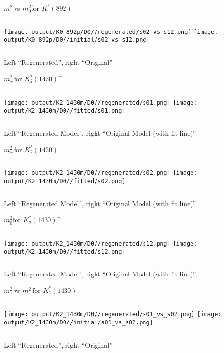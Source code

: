 \documentclass{beamer}
\newcommand{\MP}{\ensuremath{m^2_+}}
\newcommand{\MM}{\ensuremath{m^2_-}}
\newcommand{\MZ}{\ensuremath{m^2_0}}
\begin{document}
\begin{frame}{\MM vs \MZ for $K_0^*(892)^+$}
\begin{columns}[t]
\centering
\texttt{[image: output/K0\_892p/D0//regenerated/s02\_vs\_s12.png]}
\centering
\texttt{[image: output/K0\_892p/D0//initial/s02\_vs\_s12.png]}
\end{columns}
    \centering
    Left ``Regenerated'', right ``Original''
\end{frame} 

\begin{frame}{\MP for $K_2^*(1430)^-$}
\begin{columns}[t]
\centering
\texttt{[image: output/K2\_1430m/D0//regenerated/s01.png]}
\centering
\texttt{[image: output/K2\_1430m/D0//fitted/s01.png]}
\end{columns}
    \centering
    Left ``Regenerated Model'', right ``Original Model (with fit line)''
\end{frame}                   

\begin{frame}{\MM for $K_2^*(1430)^-$}
\begin{columns}[t]
\centering
\texttt{[image: output/K2\_1430m/D0//regenerated/s02.png]}
\centering
\texttt{[image: output/K2\_1430m/D0//fitted/s02.png]}
\end{columns}
    \centering
    Left ``Regenerated Model'', right ``Original Model (with fit line)''
\end{frame}                   

\begin{frame}{\MZ for $K_2^*(1430)^-$}
\begin{columns}[t]
\centering
\texttt{[image: output/K2\_1430m/D0//regenerated/s12.png]}
\centering
\texttt{[image: output/K2\_1430m/D0//fitted/s12.png]}
\end{columns}
    \centering
    Left ``Regenerated Model'', right ``Original Model (with fit line)''
\end{frame}                   


\begin{frame}{\MP vs \MM for $K_2^*(1430)^-$}
\begin{columns}[t]
\centering
\texttt{[image: output/K2\_1430m/D0//regenerated/s01\_vs\_s02.png]}
\centering
\texttt{[image: output/K2\_1430m/D0//initial/s01\_vs\_s02.png]}
\end{columns}
    \centering
    Left ``Regenerated'', right ``Original''
\end{frame} 
\end{document}
